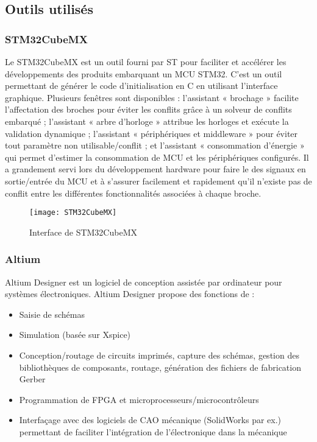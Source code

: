 \subsection{Outils utilisés}
\subsubsection{STM32CubeMX}
Le STM32CubeMX \autocite{STM32CubeMX} est un outil fourni par ST pour faciliter et accélérer les développements des produits embarquant un MCU STM32.
C'est un outil permettant de générer le code d'initialisation en C en utilisant l'interface graphique. 
Plusieurs fenêtres sont disponibles : l’assistant « brochage » facilite l’affectation des broches pour éviter les conflits grâce à un solveur de conflits embarqué ; l’assistant « arbre d’horloge » attribue les horloges et exécute la validation dynamique ; l’assistant « périphériques et middleware » pour éviter tout paramètre non utilisable/conflit ; et l’assistant « consommation d’énergie » qui permet d'estimer la consommation de MCU et les périphériques configurés.
Il a grandement servi lors du développement hardware pour faire le  des signaux en sortie/entrée du MCU et à s'assurer facilement et rapidement qu'il n'existe pas de conflit entre les différentes fonctionnalités associées à chaque broche.
        
\begin{figure}[H]
	\begin{center}
		\texttt{[image: STM32CubeMX]}
	\end{center}
	\caption{Interface de STM32CubeMX}
\end{figure}
            
\subsubsection{Altium}
Altium Designer \autocite{Altium} est un logiciel de conception assistée par ordinateur pour systèmes électroniques. Altium Designer propose des fonctions de \autocite{AltiumWiki}:
\begin{itemize}
	\item Saisie de schémas
	\item Simulation (basée sur Xspice)
	\item Conception/routage de circuits imprimés, capture des schémas, gestion des bibliothèques de composants, routage, génération des fichiers de fabrication \gls{Gerber}
	\item Programmation de FPGA et microprocesseurs/microcontrôleurs
	\item Interfaçage avec des logiciels de CAO mécanique (SolidWorks par ex.) permettant de faciliter l'intégration de l'électronique dans la mécanique
\end{itemize}
            
